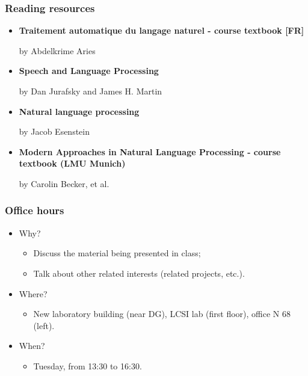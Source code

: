 \documentclass{beamer}
\begin{document}
\begin{frame}
	\frametitle{Reading resources}
	
	\begin{itemize}
		
		\item \textbf{Traitement automatique du langage naturel - course textbook [FR]}
		
		by Abdelkrime Aries
		
		
		
		\item \textbf{Speech and Language Processing} 
		
		by Dan Jurafsky and James H. Martin
		
		
		\item \textbf{Natural language processing}
		
		by Jacob Esenstein 
		
		
		\item \textbf{Modern Approaches in Natural Language Processing - course textbook (LMU Munich)}
		
		by Carolin Becker, et al.
		
		
		
	\end{itemize}
	
\end{frame}

\begin{frame}
	\frametitle{Office hours}
	
	\begin{itemize}
		
		\item Why?
		\begin{itemize}
			\item Discuss the material being presented in class;
			\item Talk about other related interests (related projects, etc.).
		\end{itemize}
		
		\item Where? 
		\begin{itemize}
			\item New laboratory building (near DG), LCSI lab (first floor), office N 68 (left).
		\end{itemize}
		
		\item When?
		\begin{itemize}
			\item Tuesday, from 13:30 to 16:30.
		\end{itemize}
		
	\end{itemize}
	
\end{frame}
\end{document}
